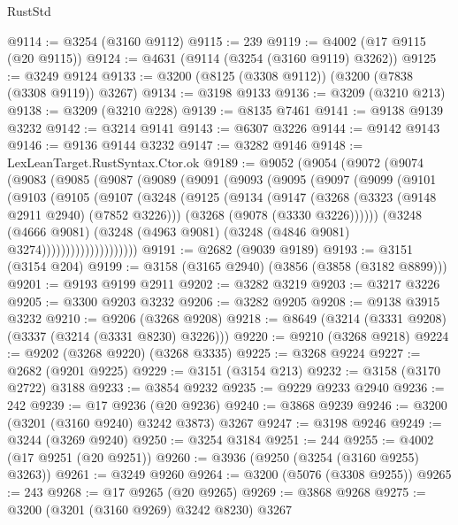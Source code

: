 \begin{lexlean}{RustStd}
\begin{coremodule}
@9114 := @3254 (@3160 @9112)
@9115 := 239
@9119 := @4002 (@17 @9115 (@20 @9115))
@9124 := @4631 (@9114 (@3254 (@3160 @9119) @3262))
@9125 := @3249 @9124
@9133 := @3200 (@8125 (@3308 @9112)) (@3200 (@7838 (@3308 @9119)) @3267)
@9134 := @3198 @9133
@9136 := @3209 (@3210 @213)
@9138 := @3209 (@3210 @228)
@9139 := @8135 @7461
@9141 := @9138 @9139 @3232
@9142 := @3214 @9141
@9143 := @6307 @3226
@9144 := @9142 @9143
@9146 := @9136 @9144 @3232
@9147 := @3282 @9146
@9148 := LexLeanTarget.RustSyntax.Ctor.ok
@9189 := @9052
    (@9054
      (@9072
        (@9074
          (@9083
            (@9085
              (@9087
                (@9089
                  (@9091
                    (@9093
                      (@9095
                        (@9097
                          (@9099
                            (@9101
                              (@9103
                                (@9105
                                  (@9107
                                    (@3248
                                      (@9125
                                        (@9134
                                          (@9147
                                            (@3268 (@3323 (@9148 @2911 @2940) (@7852 @3226)))
                                            (@3268 (@9078 (@3330 @3226))))))
                                      (@3248
                                        (@4666 @9081)
                                        (@3248
                                          (@4963 @9081)
                                          (@3248 (@4846 @9081) @3274))))))))))))))))))))
@9191 := @2682 (@9039 @9189)
@9193 := @3151 (@3154 @204)
@9199 := @3158 (@3165 @2940) (@3856 (@3858 (@3182 @8899)))
@9201 := @9193 @9199 @2911
@9202 := @3282 @3219
@9203 := @3217 @3226
@9205 := @3300 @9203 @3232
@9206 := @3282 @9205
@9208 := @9138 @3915 @3232
@9210 := @9206 (@3268 @9208)
@9218 := @8649 (@3214 (@3331 @9208) (@3337 (@3214 (@3331 @8230) @3226)))
@9220 := @9210 (@3268 @9218)
@9224 := @9202 (@3268 @9220) (@3268 @3335)
@9225 := @3268 @9224
@9227 := @2682 (@9201 @9225)
@9229 := @3151 (@3154 @213)
@9232 := @3158 (@3170 @2722) @3188
@9233 := @3854 @9232
@9235 := @9229 @9233 @2940
@9236 := 242
@9239 := @17 @9236 (@20 @9236)
@9240 := @3868 @9239
@9246 := @3200 (@3201 (@3160 @9240) @3242 @3873) @3267
@9247 := @3198 @9246
@9249 := @3244 (@3269 @9240)
@9250 := @3254 @3184
@9251 := 244
@9255 := @4002 (@17 @9251 (@20 @9251))
@9260 := @3936 (@9250 (@3254 (@3160 @9255) @3263))
@9261 := @3249 @9260
@9264 := @3200 (@5076 (@3308 @9255))
@9265 := 243
@9268 := @17 @9265 (@20 @9265)
@9269 := @3868 @9268
@9275 := @3200 (@3201 (@3160 @9269) @3242 @8230) @3267

\end{coremodule}
\end{lexlean}
